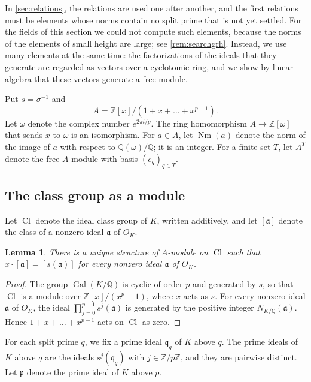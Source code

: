 \documentclass[11pt]{amsart}
\theoremstyle{plain}
\newtheorem{lemma}[theorem]{Lemma}
\theoremstyle{definition}
\begin{document}
In \cref{sec:relations}, the relations are used one after another, and the first relations must be elements whose norms contain no split prime that is not yet settled.
For the fields of this section we could not compute such elements, because the norms of the elements of small height are large; see \cref{rem:searchgrh}.
Instead, we use many elements at the same time: the factorizations of the ideals that they generate are regarded as vectors over a cyclotomic ring, and we show by linear algebra that these vectors generate a free module.

Put $s = \sigma^{-1}$ and
\[
A = \mathbb{Z}[x]/(1 + x + \dots + x^{p-1}) .
\]
Let $\omega$ denote the complex number $e^{2\pi i/p}$.
The ring homomorphism $A \to \mathbb{Z}[\omega]$ that sends $x$ to $\omega$ is an isomorphism.
For $a \in A$, let $\operatorname{Nm}(a)$ denote the norm of the image of $a$ with respect to $\mathbb{Q}(\omega)/\mathbb{Q}$; it is an integer.
For a finite set $T$, let $A^T$ denote the free $A$-module with basis $(e_q)_{q \in T}$.

\subsection{The class group as a module}

Let $\operatorname{Cl}$ denote the ideal class group of $K$, written additively, and let $[\mathfrak{a}]$ denote the class of a nonzero ideal $\mathfrak{a}$ of $O_K$.

\begin{lemma} \label{lem:module}
There is a unique structure of $A$-module on $\operatorname{Cl}$ such that $x \cdot [\mathfrak{a}] = [s(\mathfrak{a})]$ for every nonzero ideal $\mathfrak{a}$ of $O_K$.
\end{lemma}

\begin{proof}
The group $\operatorname{Gal}(K/\mathbb{Q})$ is cyclic of order $p$ and generated by $s$, so that $\operatorname{Cl}$ is a module over $\mathbb{Z}[x]/(x^p - 1)$, where $x$ acts as $s$.
For every nonzero ideal $\mathfrak{a}$ of $O_K$, the ideal $\prod_{j=0}^{p-1} s^j(\mathfrak{a})$ is generated by the positive integer $N_{K/\mathbb{Q}}(\mathfrak{a})$.
Hence $1 + x + \dots + x^{p-1}$ acts on $\operatorname{Cl}$ as zero.
\end{proof}

For each split prime $q$, we fix a prime ideal $\mathfrak{q}_q$ of $K$ above $q$.
The prime ideals of $K$ above $q$ are the ideals $s^j(\mathfrak{q}_q)$ with $j \in \mathbb{Z}/p\mathbb{Z}$, and they are pairwise distinct.
Let $\mathfrak{p}$ denote the prime ideal of $K$ above $p$.
\end{document}

